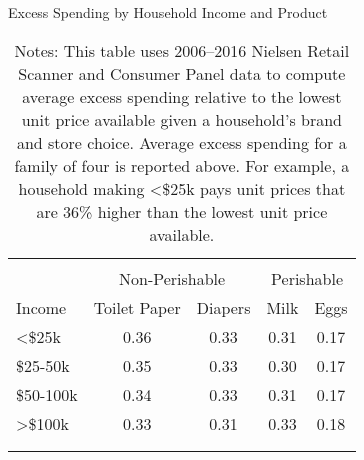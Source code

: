 \begin{table}[!htbp] \centering
\caption{Excess Spending by Household Income and Product}
\label{tab:excessSpending}
\begin{tabular}{lcccc}
\\[-1.8ex]\hline
\hline \\[-1.8ex]
            & \multicolumn{2}{c}{Non-Perishable} & \multicolumn{2}{c}{Perishable} \\
              \cline{2-3}                             \cline{4-5}
Income      & Toilet Paper  & Diapers & Milk  & Eggs \\
\hline
<\$25k      & 0.36          & 0.33    & 0.31  & 0.17 \\
\$25-50k    & 0.35          & 0.33    & 0.30  & 0.17 \\
\$50-100k   & 0.34          & 0.33    & 0.31  & 0.17 \\
>\$100k     & 0.33          & 0.31    & 0.33  & 0.18  \\
\\[-1.8ex]\hline
\hline \\[-1.8ex]
\end{tabular}
\caption*{Notes: This table uses 2006--2016 Nielsen Retail Scanner and Consumer Panel data to compute average excess spending relative to the lowest unit price available given a household's brand and store choice. Average excess spending for a family of four is reported above. For example, a household making <\$25k pays unit prices that are 36\% higher than the lowest unit price available.}
\end{table}
